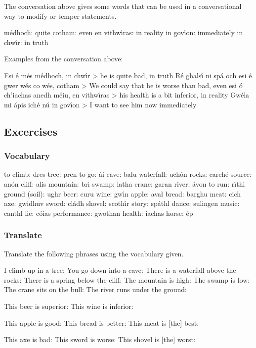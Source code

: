 The conversation above gives some words that can be used in a conversational way to modify or temper statements.

m\'{e}dhoch: quite
cotham: even
en vithw\'{\i}ras: in reality
in gov\'{\i}on: immediately
in chw\'{\i}r: in truth

Examples from the conversation above:

Esi \'{e} m\'{e}s m\'{e}dhoch, in chw\'{\i}r > he is quite bad, in truth
R\'{e} ghals\'{\i} ni sp\'{a} och esi \'{e} gwer w\'{e}s co w\'{e}s, cotham > We could say that he is worse than bad, even
esi \'{o} ch’iachas anedh m\'{e}iu, en vithw\'{\i}ras > his health is a bit inferior, in reality
Gw\'{e}la mi \'{a}pis ich\'{e} n\'{u} in gov\'{\i}on > I want to see him now immediately

\subsection{Excercises}

\subsubsection{Vocabulary}

to climb: dres
tree: pren
to go: \'{a}i
cave: balu
waterfall: uch\'{o}n
rocks: carch\'{e}
source: an\'{o}n
cliff: alis
mountain: br\'{\i}
swamp: latha
crane: garan
river: \'{a}von
to run: r\'{\i}thi
ground (soil): ughr
beer: curu
wine: gw\'{\i}n
apple: aval
bread: barghu
meat: cich
axe: gwidhuv
sword: cl\'{a}dh
shovel: scoth\'{\i}r
story: sp\'{a}thl
dance: sulingen
music: canthl
lie: c\'{o}ias
performance: gwothan
health: iachas
horse: \'{e}p

\subsubsection{Translate}

Translate the following phrases using the vocabulary given.

I climb up in a tree:
You go down into a cave:
There is a waterfall above the rocks:
There is a spring below the cliff:
The mountain is high:
The swamp is low:
The crane sits on the bull:
The river runs under the ground:

This beer is superior:
This wine is inferior:

This apple is good:
This bread is better:
This meat is [the] best:

This axe is bad:
This sword is worse:
This shovel is [the] worst:

